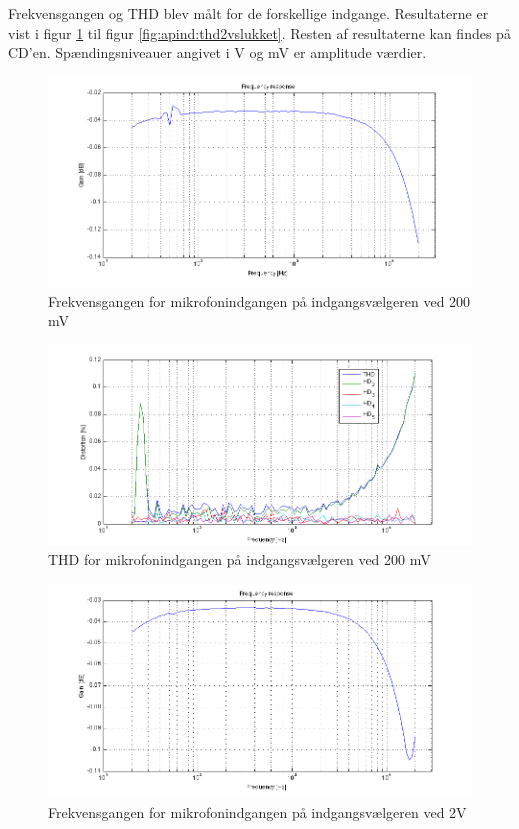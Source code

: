 Frekvensgangen og THD blev målt for de forskellige indgange. Resultaterne er vist i figur \ref{fig:apind:frek200mv} til figur \ref{fig:apind:thd2vslukket}. Resten af resultaterne kan findes på CD'en. Spændingsniveauer angivet i V og mV er amplitude værdier. 


\begin{figure}[h]
\centering
\includegraphics[width=\textwidth]{maalerapporter/indgangsvaelger/Indgangsvlger-mic-200mv-frek.png}
\caption{Frekvensgangen for mikrofonindgangen på indgangsvælgeren ved 200 mV}
\label{fig:apind:frek200mv}
\end{figure}


\begin{figure}[h]
\centering
\includegraphics[width=\textwidth]{maalerapporter/indgangsvaelger/Indgangsvlger-mic-200mv-thd.png}
\caption{THD for mikrofonindgangen på indgangsvælgeren ved 200 mV}
\label{fig:apind:thd200mv}
\end{figure}


\begin{figure}[h]
\centering
\includegraphics[width=\textwidth]{maalerapporter/indgangsvaelger/Indgangsvlger-mic-2v-frek.png}
\caption{Frekvensgangen for mikrofonindgangen på indgangsvælgeren ved 2V}
\label{fig:apind:frek2v}
\end{figure}


